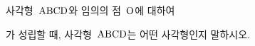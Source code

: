 사각형~$\mathrm{ABCD}$와 임의의 점~$\mathrm{O}$에 대하여 \par\smallskip{}\par\smallskip\noindent 가 성립할 때, 사각형~$\mathrm{ABCD}$는 어떤 사각형인지 말하시오.
